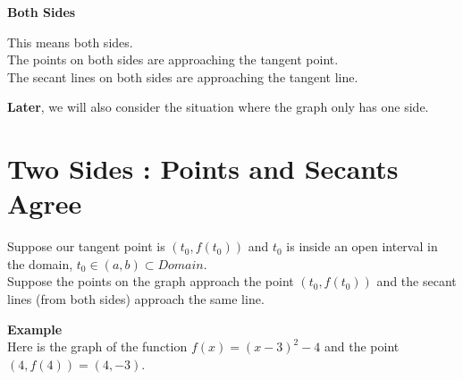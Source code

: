 \documentclass{ximera}
\begin{document}
\begin{warning} \textbf{\textcolor{red!80!black}{Both Sides}}

This means both sides. \\

The points on both sides are approaching the tangent point. \\

The secant lines on both sides are approaching the tangent line.

\end{warning}
\textbf{Later}, we will also consider the situation where the graph only has one side. \\






















\section{Two Sides : Points and Secants Agree}


Suppose our tangent point is $(t_0 , f(t_0))$ and $t_0$ is inside an open interval in the domain, $t_0 \in (a, b) \subset Domain$. \\


Suppose the points on the graph approach the point $(t_0 , f(t_0))$ and the secant lines (from both sides) approach the same line.



\textbf{\textcolor{blue!55!black}{Example}}  \\




Here is the graph of the function $f(x) = (x - 3)^2 - 4$ and the point $(4, f(4))= (4, -3)$. \\
\end{document}
